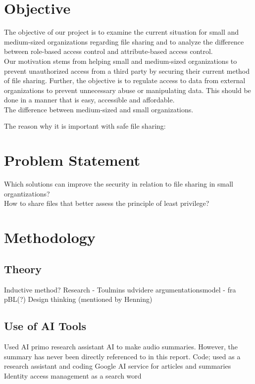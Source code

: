 \documentclass[12pt,a4paper]{article}
\begin{document}
\section{Objective}
The objective of our project is to examine the current situation for small and medium-sized organizations regarding file sharing and to analyze the difference between role-based access control and attribute-based access control. \\

Our motivation stems from helping small and medium-sized organizations to prevent unauthorized access from a third party by securing their current method of file sharing. Further, the objective is to regulate access to data from external organizations to prevent unnecessary abuse or manipulating data. This should be done in a manner that is easy, accessible and affordable.\\

The difference between medium-sized and small organizations. 

The reason why it is important with safe file sharing: 

 
\label{Problemfield}
 
\section{Problem Statement}
\label{problem_statement}
Which solutions can improve the security in relation to file sharing in small organtizations?\\

How to share files that better assess the principle of least privilege? 


\section{Methodology}
\label{methodology}

\subsection{Theory}
Inductive method? Research - Toulmins udvidere argumentationsmodel - fra pBL(?) Design thinking (mentioned by Henning) 

\subsection{Use of AI Tools}
\label{use_of_ai_tools}
Used AI primo research assistant
AI to make audio summaries. However, the summary has never been directly referenced to in this report.
Code; used as a research assistant and coding 
Google AI service for articles and summaries
Identity access management as a search word
\end{document}
